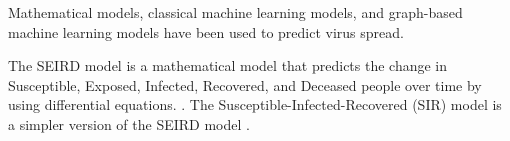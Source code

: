 \documentclass[times, 10pt,twocolumn]{article}
\begin{document}







Mathematical models, classical machine learning models, and graph-based machine learning models have been used to predict virus spread. 

The SEIRD model is a mathematical model that predicts the change in Susceptible, Exposed, Infected, Recovered, and Deceased people over time by using differential equations. \cite{SEIRD-LSTM}. The Susceptible-Infected-Recovered (SIR) model is a simpler version of the SEIRD model \cite{SIR}.
\end{document}

